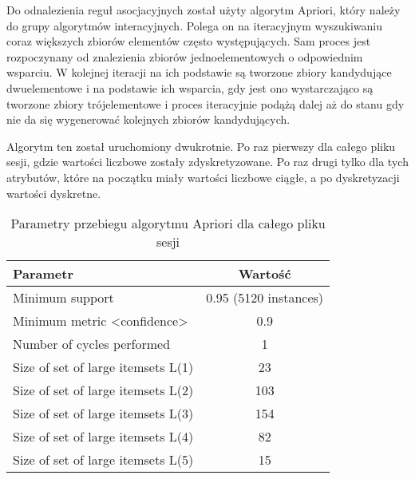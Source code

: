 \documentclass[../EDI_Task1_Karwowski_Kowalewski.tex]{subfiles}
\begin{document}
 {

    Do odnalezienia reguł asocjacyjnych został użyty algorytm Apriori, który należy
    do grupy algorytmów interacyjnych. Polega on na iteracyjnym wyszukiwaniu coraz
    większych zbiorów elementów często występujących. Sam proces jest rozpoczynany
    od znalezienia zbiorów jednoelementowych o odpowiednim wsparciu. W kolejnej
    iteracji na ich podstawie są tworzone zbiory kandydujące dwuelementowe i na
    podstawie ich wsparcia, gdy jest ono wystarczająco są tworzone zbiory
    trójelementowe i proces iteracyjnie podążą dalej aż do stanu gdy nie da się
    wygenerować kolejnych zbiorów kandydujących.

    Algorytm ten został uruchomiony dwukrotnie. Po raz pierwszy dla całego pliku sesji,
    gdzie wartości liczbowe zostały zdyskretyzowane. Po raz drugi tylko dla tych
    atrybutów, które na początku miały wartości liczbowe ciągłe, a po dyskretyzacji
    wartości dyskretne.

    \begin{table}[!htbp]
        \footnotesize
        \centering
        \begin{tabular}{|l|c|}
            \hline
            Parametr & Wartość \\ \hline
            Minimum support & 0.95 (5120 instances) \\
            Minimum metric <confidence> & 0.9 \\
            Number of cycles performed & 1 \\
            Size of set of large itemsets L(1) & 23 \\
            Size of set of large itemsets L(2) & 103 \\
            Size of set of large itemsets L(3) & 154 \\
            Size of set of large itemsets L(4) & 82 \\
            Size of set of large itemsets L(5) & 15 \\ \hline
        \end{tabular}
        \caption
        {Parametry przebiegu algorytmu Apriori dla całego pliku sesji}
        \label{apriori_params}
    \end{table}

}
\end{document}
